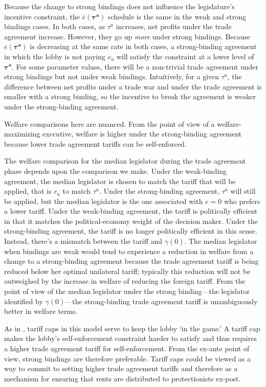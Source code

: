 \documentclass[authoryear, review]{elsarticle}
\newcommand{\ov}{\overline}
\newcommand{\bta}{\bm{\tau^a}}
\newcommand{\ga}{\gamma}
\begin{document}
Because the change to strong bindings does not influence the legislature's incentive constraint, the $\ov{e}(\bta)$ schedule is the same in the weak and strong bindings cases. In both cases, as $\tau^a$ increases, net profits under the trade agreement increase. However, they go up \textit{more} under strong bindings. Because $\ov{e}(\bta)$ is decreasing at the same rate in both cases, a strong-binding agreement in which the lobby is not paying $e_a$ will satisfy the constraint at a lower level of $\bta$. For some parameter values, there will be a non-trivial trade agreement under strong bindings but not under weak bindings. Intuitively, for a given $\tau^a$, the difference between net profits under a trade war and under the trade agreement is smaller with a strong binding, so the incentive to break the agreement is weaker under the strong-binding agreement.

Welfare comparisons here are nuanced. From the point of view of a welfare-maximizing executive, welfare is higher under the strong-binding agreement because lower trade agreement tariffs can be self-enforced.

The welfare comparison for the median legislator during the trade agreement phase depends upon the comparison we make. Under the weak-binding agreement, the median legislator is chosen to match the tariff that will be applied, that is $e_a$ to match $\tau^a$. Under the strong-binding agreement, $\tau^a$ will still be applied, but the median legislator is the one associated with $e=0$ who prefers a lower tariff. Under the weak-binding agreement, the tariff is politically efficient in that it matches the political-economy weight of the decision maker. Under the strong-binding agreement, the tariff is no longer politically efficient in this sense. Instead, there's a mismatch between the tariff and $\ga(0)$. The median legislator when bindings are weak would tend to experience a reduction in welfare from a change to a strong-binding agreement because the trade agreement tariff is being reduced below her optimal unilateral tariff; typically this reduction will not be outweighed by the increase in welfare of reducing the foreign tariff. From the point of view of the median legislator under the strong binding---the legislator identified by $\ga(0)$---the strong-binding trade agreement tariff is unambiguously better in welfare terms.

As in \citet{mrc2007}, tariff caps in this model serve to keep the lobby `in the game.' A tariff cap makes the lobby's self-enforcement constraint harder to satisfy and thus requires a higher trade agreement tariff for self-enforcement. From the ex-ante point of view, strong bindings are therefore preferable. Tariff caps could be viewed as a way to commit to setting higher trade agreement tariffs and therefore as a mechanism for ensuring that rents are distributed to protectionists ex-post.
\end{document}
